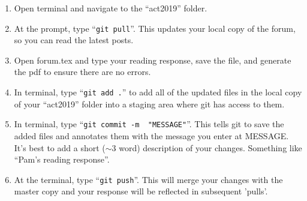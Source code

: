 \documentclass[11pt, oneside]{article}
\begin{document}
\begin{enumerate}
\item Open terminal and navigate to the
``act2019'' folder.

\item At the prompt, type ``\verb|git pull|''. This updates your
  local copy of the forum, so you can read the latest posts.

\item Open forum.tex and type your reading response, save
  the file, and generate the pdf to ensure there are no errors.
  
\item In terminal, type ``\verb|git add .|'' to add all of
  the updated files in the local copy of your
  ``act2019'' folder into a staging area where git has
  access to them.
  
\item In terminal, type ``\verb|git commit -m  "MESSAGE"|''. This tells git to save the added files and
  annotates them with the message you enter at MESSAGE. It's
  best to add a short ($ \sim $3 word) description of your
  changes. Something like ``Pam's reading response''.

\item At the terminal, type ``\verb|git push|''. This will merge
  your changes with the master copy and your response will
  be reflected in subsequent 'pulls'. 
\end{enumerate}
\end{document}
